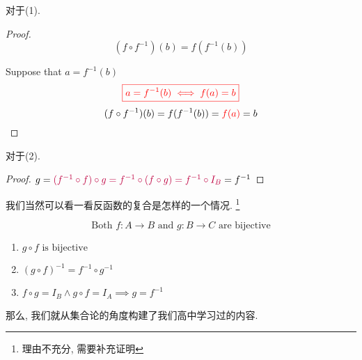对于(1). 
\begin{proof}
  \[
    (f \circ f^{-1})(b) = f(f^{-1}(b))
  \]

    Suppose that $a = f^{-1}(b)$
    \[
      \textcolor{red}{\boxed{a = f^{-1}(b) \iff f(a) = b}}
    \]
    \[
    (f \circ f^{-1})(b) = f(f^{-1}(b)) = \textcolor{red}{f(a)} = b
  \]
\end{proof}

对于(2).
\begin{proof}
  $g = \textcolor{purple}{(f^{-1} \circ f) \circ g = f^{-1} \circ (f \circ g) = f^{-1} \circ I_B} = f^{-1}$
\end{proof}

我们当然可以看一看反函数的复合是怎样的一个情况. \footnote{理由不充分, 需要补充证明}

\begin{theorem}
  \[
    \text{Both } f: A \to B \text{ and } g: B \to C \text{ are bijective}
  \]

  \begin{enumerate}
    \item $g \circ f \text{ is bijective}$
    \item $(g \circ f)^{-1} = f^{-1} \circ g^{-1}$
    \item $f \circ g = I_B \land g \circ f = I_A \implies g = f^{-1}$
  \end{enumerate}
\end{theorem}

那么, 我们就从集合论的角度构建了我们高中学习过的内容. 



